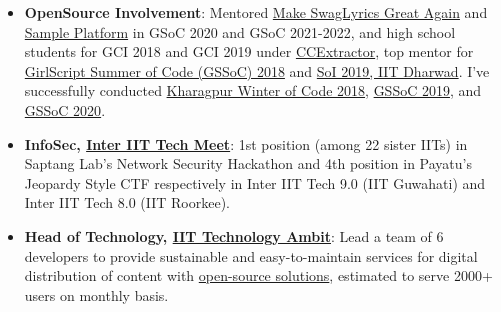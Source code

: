 \documentclass[a4paper,10pt]{extarticle} %
\begin{document}
\begin{itemize}[leftmargin=0.55cm, rightmargin=0.2cm, label={\Large\textbullet}]


  \item \textbf{OpenSource Involvement}: Mentored \href{https://summerofcode.withgoogle.com/projects/#6058060717490176}{Make SwagLyrics Great Again} and \href{https://summerofcode.withgoogle.com/projects/#6707916582682624}{Sample Platform} in GSoC 2020 and GSoC 2021-2022, and  high school students for GCI 2018 and GCI 2019 under \href{https://codein.withgoogle.com/organizations/ccextractor-development/}{CCExtractor}, top mentor for \href{https://www.gssoc.tech/}{GirlScript Summer of Code (GSSoC) 2018} and \href{https://oss2019.github.io/SoI.html}{SoI 2019, IIT Dharwad}. I've successfully conducted
        \href{https://kwoc.kossiitkgp.org/}{Kharagpur Winter of Code 2018}, \href{https://gssoc.tech/}{GSSoC 2019}, and \href{https://gssoc.tech/}{GSSoC 2020}.

  \item\textbf{InfoSec, \href{https://wiki.metakgp.org/w/Inter_IIT_Tech_Meet}{Inter IIT Tech Meet}}: 1st position (among 22 sister IITs) in Saptang Lab's Network Security Hackathon and 4th position in Payatu's Jeopardy Style CTF respectively in Inter IIT Tech 9.0 (IIT Guwahati) and Inter IIT Tech 8.0 (IIT Roorkee).

  \item\textbf{Head of Technology, {\href{https://iit-techambit.in}{IIT Technology Ambit}}}: Lead a team of 6 developers to provide sustainable and easy-to-maintain services for digital distribution of content with {\href{https://github.com/iit-technology-ambit/}{open-source solutions}}, estimated to serve 2000+ users on monthly basis.



\end{itemize}
\end{document}
